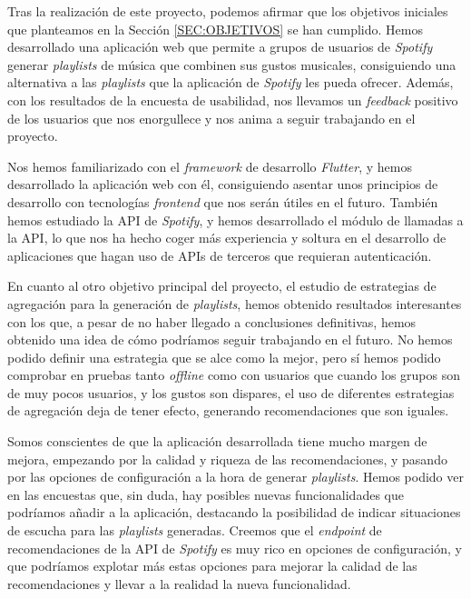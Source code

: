 Tras la realización de este proyecto, podemos afirmar que los objetivos iniciales que planteamos en la Sección \ref{SEC:OBJETIVOS} se han cumplido.
Hemos desarrollado una aplicación web que permite a grupos de usuarios de \textit{Spotify} generar \textit{playlists} de música que combinen sus gustos musicales, consiguiendo 
una alternativa a las \textit{playlists} que la aplicación de \textit{Spotify} les pueda ofrecer. Además, con los resultados de la encuesta de usabilidad, nos llevamos un \textit{feedback}
positivo de los usuarios que nos enorgullece y nos anima a seguir trabajando en el proyecto.

Nos hemos familiarizado con el \textit{framework} de desarrollo \textit{Flutter}, y hemos desarrollado la aplicación web con él, consiguiendo asentar unos principios de desarrollo con tecnologías
\textit{frontend} que nos serán útiles en el futuro. También hemos estudiado la API de \textit{Spotify}, y hemos desarrollado el módulo de llamadas a la API, lo que nos ha hecho coger más experiencia
y soltura en el desarrollo de aplicaciones que hagan uso de APIs de terceros que requieran autenticación.

En cuanto al otro objetivo principal del proyecto, el estudio de estrategias de agregación para la generación de \textit{playlists}, hemos obtenido resultados interesantes con los que, a pesar
de no haber llegado a conclusiones definitivas, hemos obtenido una idea de cómo podríamos seguir trabajando en el futuro. No hemos podido definir una estrategia que se alce como la mejor, pero
sí hemos podido comprobar en pruebas tanto \textit{offline} como con usuarios que cuando los grupos son de muy pocos usuarios, y los gustos son dispares, el uso de diferentes estrategias de agregación
deja de tener efecto, generando recomendaciones que son iguales.

Somos conscientes de que la aplicación desarrollada tiene mucho margen de mejora, empezando por la calidad y riqueza de las recomendaciones, y pasando por las opciones de configuración a la hora de generar
\textit{playlists}. Hemos podido ver en las encuestas que, sin duda, hay posibles nuevas funcionalidades que podríamos añadir a la aplicación, destacando la posibilidad de indicar situaciones de escucha para 
las \textit{playlists} generadas. Creemos que el \textit{endpoint} de recomendaciones de la API de \textit{Spotify} es muy rico en opciones de configuración, y que podríamos explotar más estas opciones para
mejorar la calidad de las recomendaciones y llevar a la realidad la nueva funcionalidad.

